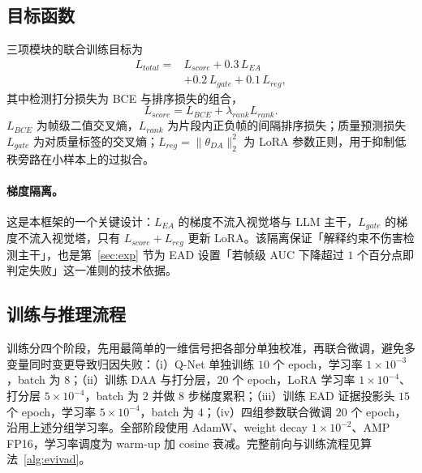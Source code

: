 \subsection{目标函数}

三项模块的联合训练目标为
\begin{align}
L_{total} = {} & L_{score} + 0.3\,L_{EA} \nonumber \\
& + 0.2\,L_{gate} + 0.1\,L_{reg},
\end{align}
其中检测打分损失为 BCE 与排序损失的组合，
\begin{equation}
L_{score} = L_{BCE} + \lambda_{rank} L_{rank}.
\end{equation}
$L_{BCE}$ 为帧级二值交叉熵，$L_{rank}$ 为片段内正负帧的间隔排序损失；质量预测损失 $L_{gate}$ 为对质量标签的交叉熵；$L_{reg} = \lVert \theta_{DA} \rVert_2^2$ 为 LoRA 参数正则，用于抑制低秩旁路在小样本上的过拟合。

\paragraph{梯度隔离。} 这是本框架的一个关键设计：$L_{EA}$ 的梯度不流入视觉塔与 LLM 主干，$L_{gate}$ 的梯度不流入视觉塔，只有 $L_{score} + L_{reg}$ 更新 LoRA。该隔离保证「解释约束不伤害检测主干」，也是第~\ref{sec:exp} 节为 EAD 设置「若帧级 AUC 下降超过 $1$ 个百分点即判定失败」这一准则的技术依据。

\subsection{训练与推理流程}

训练分四个阶段，先用最简单的一维信号把各部分单独校准，再联合微调，避免多变量同时变更导致归因失败：（i）Q-Net 单独训练 $10$ 个 epoch，学习率 $1\times10^{-3}$，batch 为 $8$；（ii）训练 DAA 与打分层，$20$ 个 epoch，LoRA 学习率 $1\times10^{-4}$、打分层 $5\times10^{-4}$，batch 为 $2$ 并做 $8$ 步梯度累积；（iii）训练 EAD 证据投影头 $15$ 个 epoch，学习率 $5\times10^{-4}$，batch 为 $4$；（iv）四组参数联合微调 $20$ 个 epoch，沿用上述分组学习率。全部阶段使用 AdamW、weight decay $1\times10^{-2}$、AMP FP16，学习率调度为 warm-up 加 cosine 衰减。完整前向与训练流程见算法~\ref{alg:evivad}。

